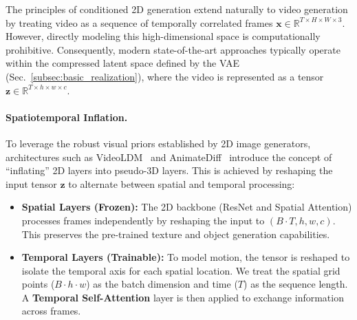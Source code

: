 \documentclass[../../book-main.tex]{subfiles}
\begin{document}
The principles of conditioned 2D generation extend naturally to video
generation by treating video as a sequence of temporally correlated
frames $\boldsymbol{x} \in \mathbb{R}^{T \times H \times W \times
3}$. However, directly modeling this high-dimensional space is
computationally prohibitive. Consequently, modern state-of-the-art
approaches typically operate within the compressed latent space
defined by the VAE (Sec.~\ref{subsec:basic_realization}), where the
video is represented as a tensor $\boldsymbol{z} \in \mathbb{R}^{T
\times h \times w \times c}$.

\paragraph{Spatiotemporal Inflation.}
To leverage the robust visual priors established by 2D image
generators, architectures such as VideoLDM~\citep{blattmann2023align}
and AnimateDiff~\citep{guo2023animatediff} introduce the concept of
``inflating'' 2D layers into pseudo-3D layers. This is achieved by
reshaping the input tensor $\boldsymbol{z}$ to alternate between
spatial and temporal processing:
\begin{itemize}
\item \textbf{Spatial Layers (Frozen):} The 2D backbone (ResNet and
    Spatial Attention) processes frames independently by reshaping
    the input to $(B \cdot T, h, w, c)$. This preserves the
    pre-trained texture and object generation capabilities.
\item \textbf{Temporal Layers (Trainable):} To model motion, the
    tensor is reshaped to isolate the temporal axis for each spatial
    location. We treat the spatial grid points ($B \cdot h \cdot w$)
    as the batch dimension and time ($T$) as the sequence length. A
    \textbf{Temporal Self-Attention} layer is then applied to
    exchange information across frames.
\end{itemize}
\end{document}
